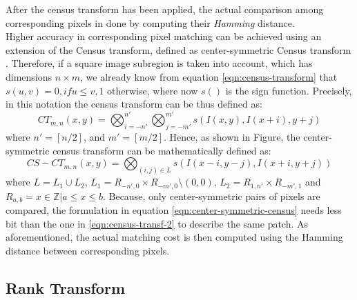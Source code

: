 After the census transform has been applied, the actual comparison among corresponding pixels in done by computing their \textit{Hamming} distance.\\ 
Higher accuracy in corresponding pixel matching can be achieved using an extension of the Census transform, defined as center-symmetric Census transform \cite{Spangenberg2013}.
Therefore, if a square image subregion is taken into account, which has dimensions $n \times m$, we already know from equation \ref{eqn:census-transform} that $s(u, v) = 0, if u \leq v, 1$ otherwise, where now $s( )$ is the sign function.
Precisely, in this notation the census transform can be thus defined as:
\begin{equation}
	\label{eqn:census-transf-2}
	CT_{m,n}(x, y) = \bigotimes_{i = -n'}^{n'} \bigotimes_{j = -m'}^{m'} s(I(x, y), I(x + i), y + j)
\end{equation}
where $n' = [n/2]$, and $m' = [m/2]$.
Hence, as shown in Figure, the center-symmetric census transform can be mathematically defined as:
\begin{equation}
	\label{eqn:center-symmetric-census}
	CS-CT_{m,n}(x, y) = \bigotimes_{(i, j) \in L} s(I(x - i, y - j), I(x + i, y + j))
\end{equation}
where $L = L_1 \cup L_2$, $L_1 = R_{-n',0} \times R_{-m',0} \setminus {(0, 0)}$, $L_2 = R_{1,n'} \times R_{-m',1}$ and $R_{a, b} = {x \in \mathbb{Z} \vert a \leq x \leq b}$.
Because, only center-symmetric pairs of pixels are compared, the formulation in equation \ref{eqn:center-symmetric-census} needs less bit than the one in \ref{eqn:census-transf-2} to describe the same patch. 
As aforementioned, the actual matching cost is then computed using the Hamming distance between corresponding pixels. 

\subsection{Rank Transform}
\label{subsection:rank-transform}

